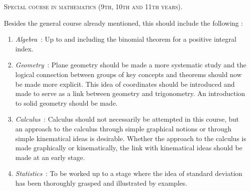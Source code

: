 \begin{center}
\textsc{Special course in mathematics (9th, 10th and 11th years).}
\end{center}

Besides the general course already mentioned, this should include the following :
\begin{enumerate}
\item {\em Algebra}~: Up to and including the binomial theorem for a positive integral index.

\item {\em Geometry}~: Plane geometry should be made a more systematic study and the logical connection between groups of key concepts and theorems should now be made more explicit. This idea of coordinates should be introduced and made to serve as a link between geometry and trigonometry. An introduction to solid geometry should be made.

\item {\em Calculus}~:  Calculus should not necessarily be attempted in this course, but an approach to the calculus through simple graphical notions or through simple kinematical ideas is desirable. Whether the approach to the calculus is made graphically or kinematically, the link with kinematical ideas should be made at an early stage.

\item {\em Statistics}~: To be worked up to a stage where the idea of standard deviation has been thoroughly grasped and illustrated by examples.
\end{enumerate}
